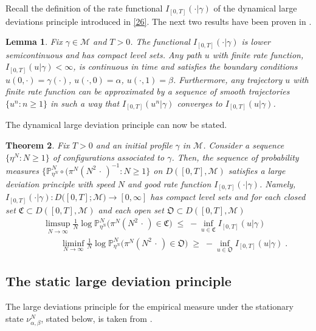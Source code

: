 \documentclass[reqno]{amsart}
\newtheorem{theorem}{Theorem}[section]
\newtheorem{lemma}[theorem]{Lemma}
\begin{document}
Recall the definition of the rate functional $I_{[0,T]} (\cdot |
\gamma)$ of the dynamical large deviations principle introduced in
\eqref{26}. The next two results have been proven in \cite{blm1}.

\begin{lemma}
\label{s11}
Fix $\gamma\in {{\mathscr M}}$ and $T>0$.  The functional $I_{[0,T]} (\cdot |
\gamma)$ is lower semicontinuous and has compact level sets. Any path
$u$ with finite rate function, $I_{[0,T]} (u | \gamma)<\infty$, is
continuous in time and satisfies the boundary conditions $u(0,\cdot) =
\gamma(\cdot)$, $u(\cdot, 0) = \alpha$, $u(\cdot, 1) =
\beta$. Furthermore, any trajectory $u$ with finite rate function can
be approximated by a sequence of smooth trajectories $\{u^n : n\ge
1\}$ in such a way that $I_{[0,T]}(u^n | \gamma)$ converges to
$I_{[0,T]}(u | \gamma)$.
\end{lemma}
 

The dynamical large deviation principle can now be stated.

\begin{theorem}
\label{s08}
Fix $T>0$ and an initial profile $\gamma$ in ${{\mathscr M}}$.  Consider a
sequence $\{\eta^N : N\ge 1\}$ of configurations associated to
$\gamma$.  Then, the sequence of probability measures $\{{{\mathbb P}}^N_{\eta^N} \circ (\pi^N (N^2 \,\cdot\,)^{-1} : N\ge 1\}$ on
$D([0,T], {{\mathscr M}})$ satisfies a large deviation principle with speed $N$
and good rate function $I_{[0,T]}(\cdot|\gamma)$.  Namely,
$I_{[0,T]}(\cdot|\gamma): D\big([0,T]; {{\mathscr M}}\big) \to [0,\infty]$ has
compact level sets and for each closed set ${{\mathfrak C}} \subset D([0,T], {{\mathscr M}})$ and each open set ${{\mathfrak O}} \subset D([0,T], {{\mathscr M}})$
\begin{eqnarray*}
&& 
\limsup_{N\to\infty} \frac 1N \log {{\mathbb P}}^N_{\eta^N} 
\big( \pi^N (N^2 \,\cdot\,) \in {{\mathfrak C}}\big)
\;\leq\; - \inf_{u \in {{\mathfrak C}}} I_{[0,T]} (u | \gamma)  
\\
&& \qquad 
\liminf_{N\to\infty} \frac 1N \log {{\mathbb P}}^N_{\eta^N} 
\big( \pi^N (N^2 \,\cdot\,) \in {{\mathfrak O}} \big) 
\;\geq\; -  \inf_{u \in {{\mathfrak O}}} I_{[0,T]} (u |\gamma) \; . 
\end{eqnarray*}
\end{theorem}

\subsection*{The static large deviation principle}
The large deviations principle for the empirical measure under the
stationary state $\nu^N_{\alpha, \beta}$, stated below, is taken from
\cite{bg2, f1}.
\end{document}
